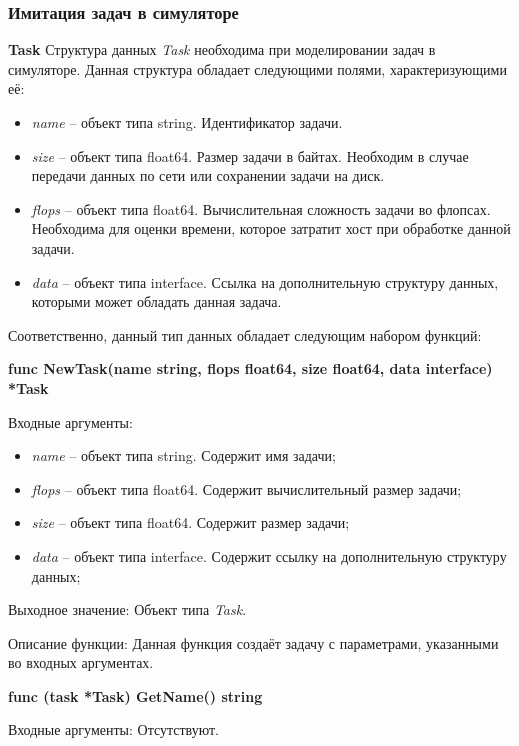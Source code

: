 \subsubsection{Имитация задач в симуляторе}
\textbf{Task}
Структура данных \textit{Task} необходима при моделировании задач в симуляторе. Данная структура обладает следующими полями, характеризующими  её:
\begin{itemize}
	\item \textit{	name} -- объект типа string. Идентификатор задачи.

	\item \textit{	size} -- объект типа float64. Размер задачи в байтах. Необходим в случае передачи данных по сети или сохранении задачи на диск.

	\item \textit{	flops} -- объект типа float64. Вычислительная сложность задачи во флопсах. Необходима для оценки времени, которое затратит хост при обработке данной задачи.

	\item \textit{	data} -- объект типа interface{}. Ссылка на дополнительную структуру данных, которыми может обладать данная задача. 

\end{itemize}

Соответственно, данный тип данных обладает следующим набором функций:

\textbf{func NewTask(name string, flops float64, size float64, data interface{}) *Task}

Входные аргументы:
\begin{itemize}
	\item \textit{name} -- объект типа string. Содержит имя задачи;
	\item \textit{flops} -- объект типа float64. Содержит вычислительный размер задачи; 
	\item \textit{size} -- объект типа float64. Содержит размер задачи;
	\item \textit{data} --  объект типа interface{}. Содержит ссылку на дополнительную структуру данных;
\end{itemize}

Выходное значение: Объект типа \textit{Task}.

Описание функции: Данная функция создаёт задачу с параметрами, указанными во входных аргументах.

\textbf{	func (task *Task) GetName() string }

Входные аргументы: Отсутствуют.

